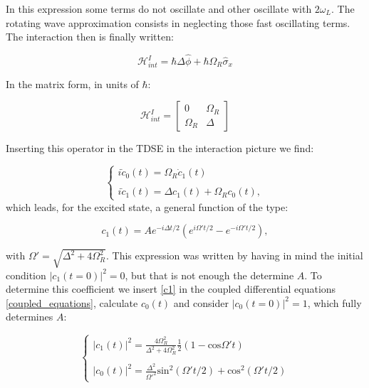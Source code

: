 In this expression some terms do not oscillate and other oscillate with $2\omega_{L}$. The rotating wave approximation consists in neglecting those fast oscillating terms. The interaction then is finally written:

\begin{equation}
    \mathcal{H}_{int}^{I} = \hbar \Delta \hat{\phi} + \hbar\Omega_{R} \hat{\sigma}_{x}
\end{equation}

In the matrix form, in units of $\hbar$:

\[
\mathcal{H}_{int}^{I} =
  \begin{bmatrix}
    0 & \Omega_{R}  \\
    \Omega_{R} & \Delta
  \end{bmatrix}
\]

Inserting this operator in the TDSE in the interaction picture we find:

\begin{equation} \label{coupled_equations}
\begin{cases}
    i \dot{c}_{0}(t) = \Omega_{R} \dot{c}_{1}(t) \\
    \\
    i \dot{c}_{1}(t) = \Delta c_{1}(t) + \Omega_{R} c_{0}(t),
\end{cases}
\end{equation}
which leads, for the excited state, a general function of the type:

\begin{equation} \label{c1}
    c_{1}(t) = A e^{-i\Delta t / 2}(e^{i\Omega't/2} - e^{-i\Omega't/2}),
\end{equation}

with $\Omega' = \sqrt{\Delta^{2} + 4 \Omega_{R}^{2}}$. This expression was written by having in mind the initial condition $|c_{1}(t=0)|^{2} = 0$, but that is not enough the determine $A$. To determine this coefficient we insert \ref{c1} in the coupled differential equations \ref{coupled_equations}, calculate $c_{0}(t)$ and consider $|c_{0}(t=0)|^{2} = 1$, which fully determines $A$:

\begin{equation}
    \begin{cases}
    |c_{1}(t)|^{2} = \frac{4\Omega_{R}^{2}}{\Delta^{2} + 4 \Omega_{R}^{2}} \frac{1}{2}(1 - \textrm{cos} \Omega't) \\
    \\
    |c_{0}(t)|^{2} = \frac{\Delta^{2}} {\Omega'^{2}} \textrm{sin}^{2}(\Omega't/2) + \textrm{cos}^{2}(\Omega't/2)
    \end{cases}
\end{equation}


